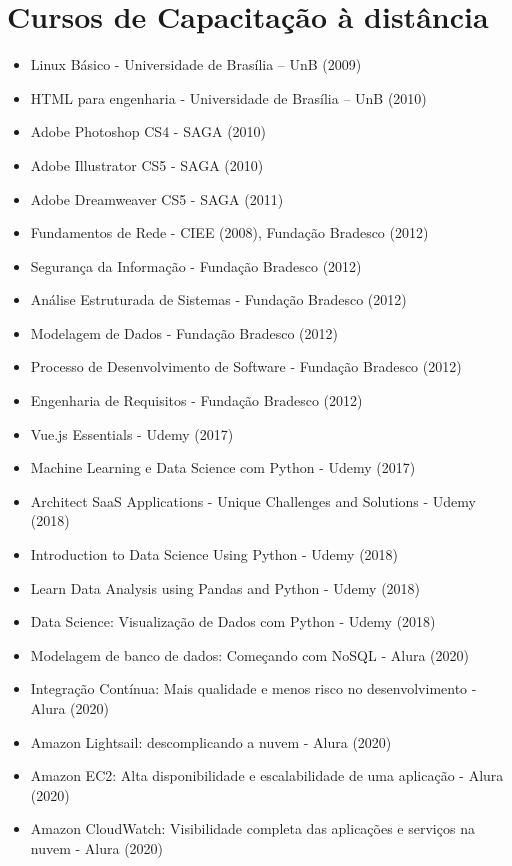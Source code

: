 \section{Cursos de Capacitação à distância}
\begin{itemize}
    \item Linux Básico - Universidade de Brasília – UnB (2009)
    \item HTML para engenharia - Universidade de Brasília – UnB (2010)
    \item Adobe Photoshop CS4 - SAGA (2010)
    \item Adobe Illustrator CS5 - SAGA (2010)
    \item Adobe Dreamweaver CS5 - SAGA (2011)
    \item Fundamentos de Rede - CIEE (2008), Fundação Bradesco (2012)
    \item Segurança da Informação - Fundação Bradesco (2012)
    \item Análise Estruturada de Sistemas - Fundação Bradesco (2012)
    \item Modelagem de Dados - Fundação Bradesco (2012)
    \item Processo de Desenvolvimento de Software - Fundação Bradesco (2012)
    \item Engenharia de Requisitos - Fundação Bradesco (2012)
    \item Vue.js Essentials - Udemy (2017)
    \item Machine Learning e Data Science com Python - Udemy (2017)
    \item Architect SaaS Applications - Unique Challenges and Solutions - Udemy (2018)
    \item Introduction to Data Science Using Python - Udemy (2018)
    \item Learn Data Analysis using Pandas and Python - Udemy (2018)
    \item Data Science: Visualização de Dados com Python - Udemy (2018)
    \item Modelagem de banco de dados: Começando com NoSQL - Alura (2020)
    \item Integração Contínua: Mais qualidade e menos risco no desenvolvimento - Alura (2020)
    \item Amazon Lightsail: descomplicando a nuvem - Alura (2020)
    \item Amazon EC2: Alta disponibilidade e escalabilidade de uma aplicação - Alura (2020)
    \item Amazon CloudWatch: Visibilidade completa das aplicações e serviços na nuvem - Alura (2020)

\end{itemize}

